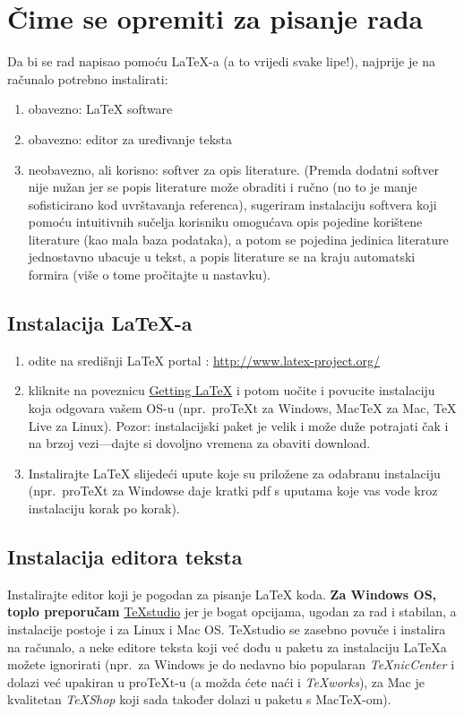 \section{Čime se opremiti za pisanje rada}
Da bi se rad napisao pomoću \LaTeX-a (a to vrijedi svake lipe!), najprije je na računalo potrebno instalirati:
\begin{enumerate}
	\item obavezno: \LaTeX{} software 
	\item obavezno: editor za uređivanje teksta 
	\item neobavezno, ali korisno: softver za opis literature. (Premda dodatni softver nije nužan jer se popis literature može obraditi i ručno (no to je manje sofisticirano kod uvrštavanja referenca), sugeriram instalaciju softvera koji pomoću intuitivnih sučelja korisniku omogućava opis pojedine korištene literature (kao mala baza podataka), a potom se pojedina jedinica literature jednostavno ubacuje u tekst, a popis literature se na kraju automatski formira (više o tome pročitajte u nastavku).
\end{enumerate}

\subsection{Instalacija \LaTeX-a}
\begin{enumerate}
	\item odite na središnji \LaTeX{} portal \cite{latex_project}: \url{http://www.latex-project.org/}
	\item kliknite na poveznicu \href{http://www.latex-project.org/ftp.html}{Getting LaTeX} i potom uočite i povucite instalaciju koja odgovara vašem OS-u (npr.\ proTeXt za Windows, MacTeX za Mac, TeX Live za Linux). Pozor: instalacijski paket je velik i može duže potrajati čak i na brzoj vezi---dajte si dovoljno vremena za obaviti download.
	\item Instalirajte \LaTeX{} slijedeći upute koje su priložene za odabranu instalaciju (npr.\ proTeXt za Windowse daje kratki pdf s uputama koje vas vode kroz instalaciju korak po korak).
\end{enumerate}

\subsection{Instalacija editora teksta}
Instalirajte editor koji je pogodan za pisanje \LaTeX{} koda. \textbf{Za Windows OS, toplo preporučam}  \href{http://www.texstudio.org}{{\color{blue} TeXstudio}} \cite{texstudio} jer je bogat opcijama, ugodan za rad i stabilan, a instalacije postoje i za Linux i Mac OS. TeXstudio se zasebno povuče i instalira na računalo, a neke editore teksta koji već dođu u paketu za instalaciju LaTeXa možete ignorirati (npr.\ za Windows je do nedavno bio popularan \emph{TeXnicCenter} i dolazi već upakiran u proTeXt-u (a možda ćete naći i \emph{TeXworks}), za Mac je kvalitetan \emph{TeXShop} koji sada također dolazi u paketu s MacTeX-om). 

